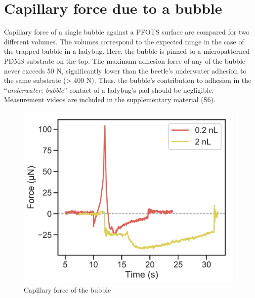 \documentclass[english]{achemso}
\begin{document}
\section{Capillary force due to a bubble\label{subsec:Capillary-force-due}}

Capillary force of a single bubble against a PFOTS surface are compared
for two different volumes. The volumes correspond to the expected
range in the case of the trapped bubble in a ladybug. Here, the bubble
is pinned to a micropatterned PDMS substrate on the top. The maximum
adhesion force of any of the bubble never exceeds 50 \textmu N,
significantly lower than the beetle's underwater adhesion to the same
substrate (> 400 \textmu N). Thus, the bubble's contribution
to adhesion in the ``\emph{underwater: bubble}'' contact of a ladybug's
pad should be negligible. Measurement videos are included in the supplementary material (S6).

\begin{figure}[H]
\begin{centering}
\includegraphics{FigureS4-Expt_bubble_force}\caption{Capillary force of the bubble}
\par\end{centering}
\end{figure}


\end{document}

